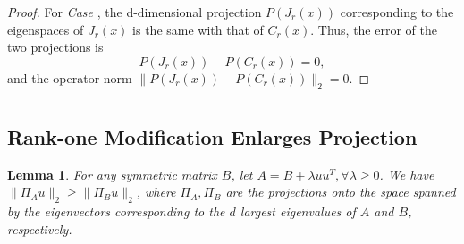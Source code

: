 \documentclass[aos,preprint]{imsart}
\newtheorem{lemma}[theorem]{Lemma}
\theoremstyle{remark}
\newtheorem*{remark}{Remark}
\begin{document}
\begin{appendix}
\begin{proof}
For {\it Case {}},  the d-dimensional projection $P(J_r(x))$ corresponding to the eigenspaces of $J_r(x)$ is the same with that of $C_r(x)$. Thus, the error of the two projections is
\[
P(J_r(x)) - P(C_r(x)) = 0,
\]
and the operator norm $\|P(J_r(x)) - P(C_r(x))\|_2=0$.

\end{proof}

\section{}
\subsection{Rank-one Modification Enlarges Projection}
\begin{lemma}
{ For any symmetric matrix $B$, let $A = B +\lambda uu^T, \forall \lambda\geq 0$. We  have $\|\Pi_A u\|_2\geq \|\Pi_B u\|_2$, where $\Pi_A, \Pi_B$ are the projections onto the space spanned by the eigenvectors corresponding to the $d$ largest eigenvalues of $A$ and $B$, respectively.}
\label{projection_enlarge}
\end{lemma}



\end{appendix}
\end{document}

